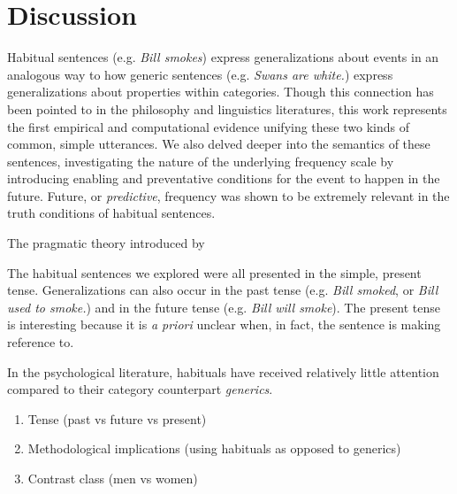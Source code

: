 \documentclass[10pt,letterpaper]{article}
\begin{document}
\section{Discussion}


Habitual sentences (e.g. \emph{Bill smokes}) express generalizations about events in an analogous way to how generic sentences (e.g. \emph{Swans are white.}) express generalizations about properties within categories. 
Though this connection has been pointed to in the philosophy and linguistics literatures, this work represents the first empirical and computational evidence unifying these two kinds of common, simple utterances. 
We also delved deeper into the semantics of these sentences, investigating the nature of the underlying frequency scale by introducing enabling and preventative conditions for the event to happen in the future. 
Future, or \emph{predictive}, frequency was shown to be extremely relevant in the truth conditions of habitual sentences. 

The pragmatic theory introduced by  

The habitual sentences we explored were all presented in the simple, present tense.
Generalizations can also occur in the past tense (e.g. \emph{Bill smoked}, or \emph{Bill used to smoke.}) and in the future tense (e.g. \emph{Bill will smoke}). 
The present tense is interesting because it is \emph{a priori} unclear when, in fact, the sentence is making reference to.  

In the psychological literature, habituals have received relatively little attention compared to their category counterpart \emph{generics}. 

\begin{enumerate}
\item Tense (past vs future vs present)
\item Methodological implications (using habituals as opposed to generics)
\item Contrast class (men vs women)
\end{enumerate}



\setlength{\bibleftmargin}{.125in}
\setlength{\bibindent}{-\bibleftmargin}


\end{document}
